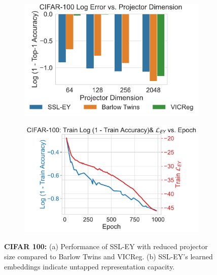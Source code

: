 \begin{figure}[H]
    \begin{subfigure}[b]{0.47\textwidth}
        \centering
        \includegraphics[width=\textwidth]{figures/SSL/cifar100_proj_dim_log_error}
        \caption{}
        \label{fig: ssl projector dimensions 100}
    \end{subfigure}
    \begin{subfigure}[b]{0.47\textwidth}
        \centering
        \includegraphics[width=\textwidth]{figures/SSL/cifar100_corr_vs_acc_log_error}
        \caption{}
        \label{fig:ssl learning curve cifar100 vs corr}
    \end{subfigure}
    \caption{\textbf{CIFAR 100: }(a) Performance of SSL-EY with reduced projector size compared to Barlow Twins and VICReg. (b) SSL-EY's learned embeddings indicate untapped representation capacity.}
    \label{fig: ssl projector cifar 100}
\end{figure}


